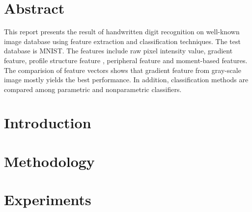 \documentclass[12pt]{article} %
\begin{document}
\section{Abstract}
This report presents the result of handwritten digit recognition on well-known image database using feature extraction and classification techniques. The test database is MNIST. The features include raw pixel intensity value, gradient feature, profile structure feature \cite{liu2002handwritten}, peripheral feature and moment-based features. The comparision of feature vectors shows that gradient feature from gray-scale image mostly yields the best performance\cite{liu2004handwritten}. In addition, classification methods are compared among parametric and nonparametric classifiers.  



\section{Introduction} %




\section{Methodology} %




\section{Experiments} %

\end{document}
